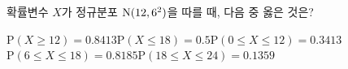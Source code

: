확률변수 $X$가 정규분포 $\mathrm{N}(12{,}\mkern3mu\mathopen{}6^2)$을 따를 때, 다음 중 옳은 것은? 
\begin{choicesv}{$\mathrm{P}(X\ge 12)=0.8413$}{$\mathrm{P}(X\le 18)=0.5$}{$\mathrm{P}(0\le X\le 12)=0.3413$}{$\mathrm{P}(6\le X\le 18)=0.8185$}{$\mathrm{P}(18\le X\le 24)=0.1359$}\end{choicesv}
